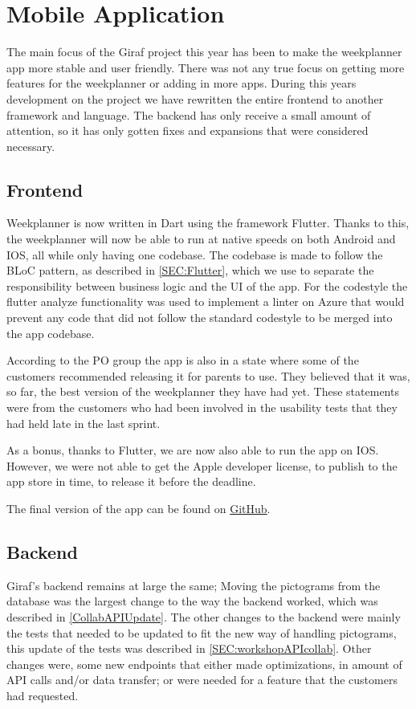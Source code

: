 \section{Mobile Application}
The main focus of the Giraf project this year has been to make the weekplanner app more stable and user friendly.
There was not any true focus on getting more features for the weekplanner or adding in more apps.
During this years development on the project we have rewritten the entire frontend to another framework and language.
The backend has only receive a small amount of attention, so it has only gotten fixes and expansions that were considered necessary.

\subsection{Frontend}
Weekplanner is now written in Dart using the framework Flutter.
Thanks to this, the weekplanner will now be able to run at native speeds on both Android and IOS, all while only having one codebase.
The codebase is made to follow the BLoC pattern, as described in \autoref{SEC:Flutter}, which we use to separate the responsibility between business logic and the UI of the app. 
For the codestyle the flutter analyze functionality was used to implement a linter on Azure that would prevent any code that did not follow the standard codestyle to be merged into the app codebase.

According to the PO group the app is also in a state where some of the customers recommended releasing it for parents to use.
They believed that it was, so far, the best version of the weekplanner they have had yet.
These statements were from the customers who had been involved in the usability tests that they had held late in the last sprint.

As a bonus, thanks to Flutter, we are now also able to run the app on IOS.
However, we were not able to get the Apple developer license, to publish to the app store in time, to release it before the deadline.

The final version of the app can be found on \href{https://github.com/aau-giraf/weekplanner/tree/2019-Final}{GitHub}.


\subsection{Backend}
Giraf's backend remains at large the same; Moving the pictograms from the database was the largest change to the way the backend worked, which was described in \autoref{CollabAPIUpdate}.
The other changes to the backend were mainly the tests that needed to be updated to fit the new way of handling pictograms, this update of the tests was described in \autoref{SEC:workshopAPIcollab}.
Other changes were, some new endpoints that either made optimizations, in amount of API calls and/or data transfer; or were needed for a feature that the customers had requested.

